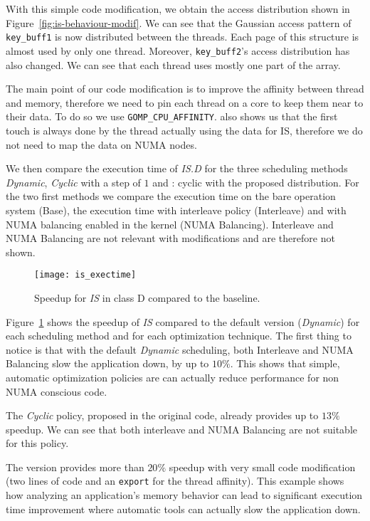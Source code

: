 With this simple code modification, we obtain the access distribution
shown in Figure~\ref{fig:is-behaviour-modif}. We can see that the Gaussian
access pattern of \texttt{key\_buff1} is now distributed between the threads. Each page
of this structure is almost used by only one thread. Moreover,
\texttt{key\_buff2}'s access distribution has also changed. We can see that
each thread uses mostly one part of the array.

The main point of our code modification is to improve the affinity between
thread and memory, therefore we need to pin each thread on a core to keep them
near to their data. To do so we use \texttt{GOMP\_CPU\_AFFINITY}. \TABARNAC
also shows us that the first touch is always done by the thread actually using
the data for IS, therefore we do not need to map the data on NUMA nodes.

We then compare the execution time of \emph{IS.D} for the three scheduling
methods \emph{Dynamic}, \emph{Cyclic} with a step of $1$ and \TABARNAC:
cyclic with the proposed distribution. For the two first methods we compare the
execution time on the bare operation system (Base), the execution time with
interleave policy (Interleave) and with NUMA balancing enabled in the kernel
(NUMA Balancing). Interleave and NUMA Balancing are not relevant with
\TABARNAC modifications and are therefore not shown.

\begin{figure}[htb]
    \centering
    \texttt{[image: is\_exectime]}
    \caption{Speedup for \emph{IS} in class D compared to the baseline.}
\label{fig:is-res}
\end{figure}

Figure~\ref{fig:is-res} shows the speedup of \emph{IS} compared to
the default version (\emph{Dynamic}) for each scheduling method and for each
optimization technique. The first thing to notice is that with the default
\emph{Dynamic} scheduling, both Interleave and NUMA Balancing slow
the application down, by up to $10\%$. This shows that simple, automatic optimization policies are can actually reduce performance
for non NUMA conscious code.

The \emph{Cyclic} policy, proposed in the original code, already provides up to $13\%$
speedup. We can see that both interleave and NUMA Balancing are not suitable
for this policy.

The \TABARNAC version provides more than $20\%$ speedup with very small code
modification (two lines of code and an \texttt{export} for the thread affinity).
This example shows how analyzing an application's memory behavior can lead to
significant execution time improvement where automatic tools can actually slow
the application down.

